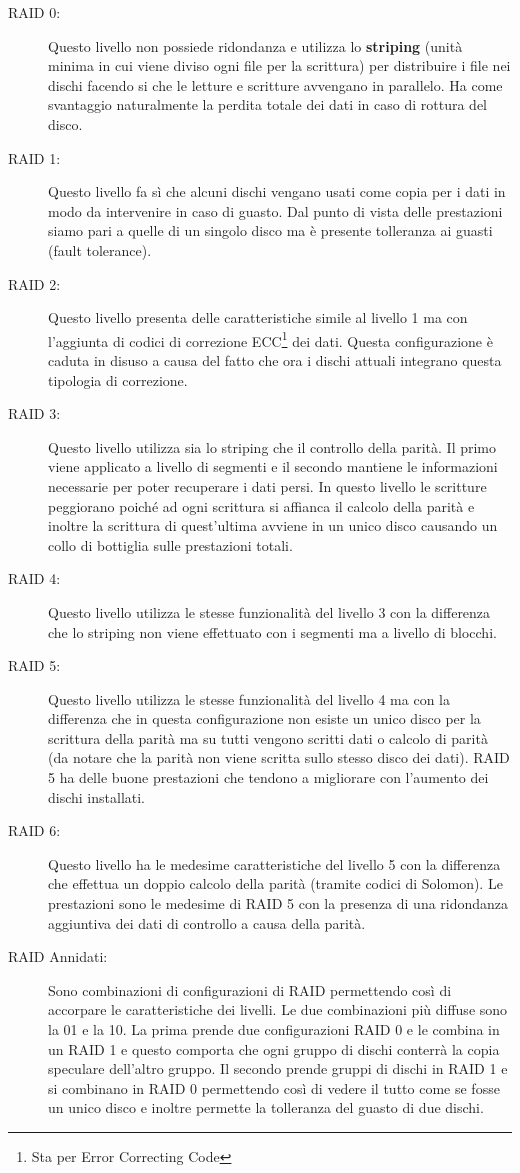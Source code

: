 \begin{description} 
  \item[RAID 0:]Questo livello non possiede ridondanza e utilizza lo \textbf{striping} (unità minima in cui viene diviso ogni file per la scrittura) per distribuire i file nei dischi facendo si che le letture e scritture avvengano in parallelo. Ha come svantaggio naturalmente la perdita totale dei dati in caso di rottura del disco.
  \item[RAID 1:]Questo livello fa sì che alcuni dischi vengano usati come copia per i dati in modo da intervenire in caso di guasto. Dal punto di vista delle prestazioni siamo pari a quelle di un singolo disco ma è presente tolleranza ai guasti (fault tolerance).
  \item[RAID 2:] Questo livello presenta delle caratteristiche simile al livello 1 ma con l'aggiunta di codici di correzione ECC\footnote{Sta per Error Correcting Code} dei dati. Questa configurazione è caduta in disuso a causa del fatto che ora i dischi attuali integrano questa tipologia di correzione.
  \item[RAID 3:] Questo livello utilizza sia lo striping che il controllo della parità. Il primo viene applicato a livello di segmenti e il secondo mantiene le informazioni necessarie per poter recuperare i dati persi. In questo livello le scritture peggiorano poiché ad ogni scrittura si affianca il calcolo della parità e inoltre la scrittura di quest'ultima avviene in un unico disco causando un collo di bottiglia sulle prestazioni totali.
  \item[RAID 4:] Questo livello utilizza le stesse funzionalità del livello 3 con la differenza che lo striping non viene effettuato con i segmenti ma a livello di blocchi.
  \item[RAID 5:] Questo livello utilizza le stesse funzionalità del livello 4 ma con la differenza che in questa configurazione non esiste un unico disco per la scrittura della parità ma su tutti vengono scritti dati o calcolo di parità (da notare che la parità non viene scritta sullo stesso disco dei dati). RAID 5 ha delle buone prestazioni che tendono a migliorare con l'aumento dei dischi installati.
  \item[RAID 6:] Questo livello ha le medesime caratteristiche del livello 5 con la differenza che effettua un doppio calcolo della parità (tramite codici di Solomon). Le prestazioni sono le medesime di RAID 5 con la presenza di una ridondanza aggiuntiva dei dati di controllo a causa della parità.
  \item[RAID Annidati:] Sono combinazioni di configurazioni di RAID permettendo così di accorpare le caratteristiche dei livelli. Le due combinazioni più diffuse sono la 01 e la 10. La prima prende due configurazioni RAID 0 e le combina in un RAID 1 e questo comporta che ogni gruppo di dischi conterrà la copia speculare dell'altro gruppo. Il secondo prende gruppi di dischi in RAID 1 e si combinano in RAID 0 permettendo così di vedere il tutto come se fosse un unico disco e inoltre permette la tolleranza del guasto di due dischi.
\end{description}
